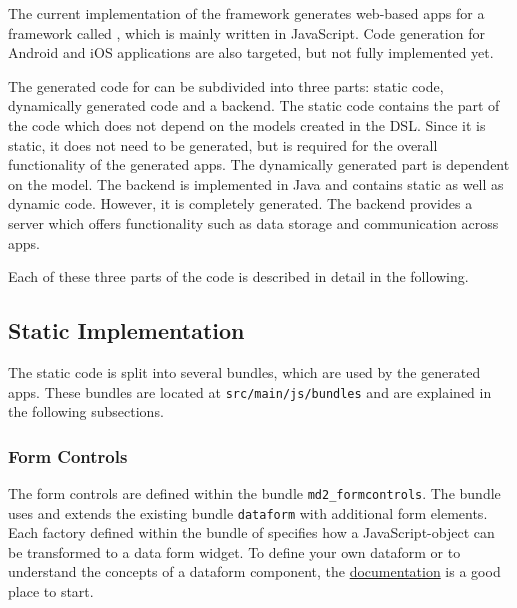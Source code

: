 
\lstset{language=Simple}

\label{sec:dev-mapapps}

The current implementation of the \MD framework generates web-based apps for a framework called 
\mapapps, which is mainly written in JavaScript. Code generation for Android and iOS applications are also targeted, but not fully implemented yet.

The generated code for \mapapps can be subdivided into three parts: static \mapapps code, dynamically generated \mapapps code and a backend. The static \mapapps code contains the part of the code which does not depend on the models created in the \MD DSL. Since it is static, it does not need to be generated, but is required for the overall functionality of the generated apps. The dynamically generated part is dependent on the model. The backend is implemented in Java and contains static as well as dynamic code. However, it is completely generated. The backend provides a server which offers functionality such as data storage and communication across apps.

Each of these three parts of the code is described in detail in the following.


\subsection{Static \mapapps Implementation}

The static \mapapps code is split into several bundles, which are used by the generated \mapapps apps. These bundles are located at \lstinline!src/main/js/bundles! and are explained in the following subsections.

\subsubsection{Form Controls}

The form controls are defined within the bundle \lstinline!md2_formcontrols!. The bundle uses and extends the existing \mapapps bundle \lstinline|dataform| with additional form elements. Each factory defined within the bundle of \MD specifies how a JavaScript-object can be transformed to a data form widget. To define your own dataform or to understand the concepts of a dataform component, the \href{http://developernetwork.conterra.de/documentation/31/developers/dataform}{\mapapps documentation} is a good place to start.

